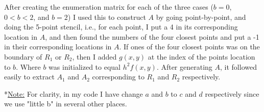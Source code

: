 \documentclass[12pt]{article}
\begin{document}
\noindent
After creating the enumeration matrix for each of the three cases ($b = 0$, $0 < b < 2$, and $b = 2$) I used this to construct $A$ by going point-by-point, and doing the 5-point stencil, i.e., for each point, I put a 4 in its corresponding location in $A$, and then found the numbers of the four closest points and put a -1 in their corresponding locations in $A$.  If ones of the four closest points was on the boundary of $R_1$ or $R_2$, then I added $g(x,y)$ at the index of the points location to $b$.  Where $b$ was initialized to equal $h^2f(x,y)$.  After generating $A$, it followed easily to extract $A_1$ and $A_2$ corresponding to $R_1$ and $R_2$ respectively.

\noindent
*\underline{Note:} For clarity, in my code I have change $a$ and $b$ to $c$ and $d$ respectively since we use "little b" in several other places.
\end{document}
